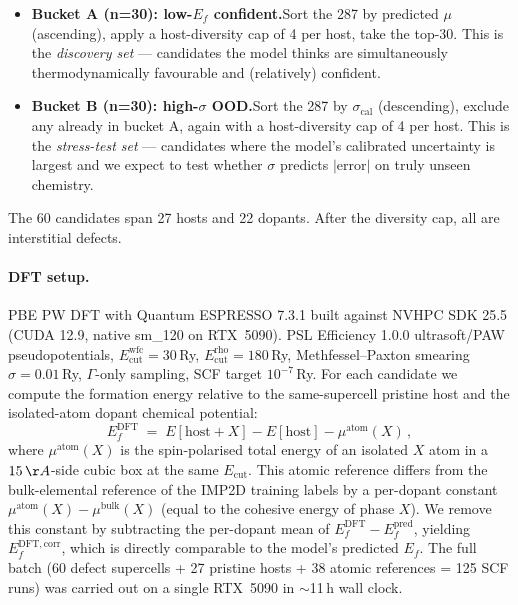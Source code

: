 \begin{itemize}
\item \textbf{Bucket A (n=30): low-$E_f$ confident.}\;Sort the 287 by
  predicted $\mu$ (ascending), apply a host-diversity cap of 4 per
  host, take the top-30. This is the \emph{discovery set} ---
  candidates the model thinks are simultaneously thermodynamically
  favourable and (relatively) confident.
\item \textbf{Bucket B (n=30): high-$\sigma$ OOD.}\;Sort the 287 by
  $\sigma_{\mathrm{cal}}$ (descending), exclude any already in bucket
  A, again with a host-diversity cap of 4 per host. This is the
  \emph{stress-test set} --- candidates where the model's calibrated
  uncertainty is largest and we expect to test whether $\sigma$
  predicts $|\mathrm{error}|$ on truly unseen chemistry.
\end{itemize}

The 60 candidates span 27 hosts and 22 dopants. After the
diversity cap, all are interstitial defects.

\paragraph{DFT setup.}
PBE PW DFT with Quantum ESPRESSO 7.3.1 built against NVHPC SDK 25.5
(CUDA 12.9, native sm\_120 on RTX~5090). PSL Efficiency 1.0.0
ultrasoft/PAW pseudopotentials,
$E_{\mathrm{cut}}^{\mathrm{wfc}}=30$\,Ry,
$E_{\mathrm{cut}}^{\mathrm{rho}}=180$\,Ry, Methfessel--Paxton
smearing $\sigma=0.01$\,Ry, $\Gamma$-only sampling, SCF target
$10^{-7}$\,Ry. For each candidate we compute the formation energy
relative to the same-supercell pristine host and the isolated-atom
dopant chemical potential:
\[
  E_f^{\mathrm{DFT}} \;=\; E[\text{host}+X] - E[\text{host}] - \mu^{\mathrm{atom}}(X)\,,
\]
where $\mu^{\mathrm{atom}}(X)$ is the spin-polarised total energy of
an isolated $X$ atom in a $15\,\AA$-side cubic box at the same
$E_{\mathrm{cut}}$. This atomic reference differs from the
bulk-elemental reference of the IMP2D training labels by a
per-dopant constant $\mu^{\mathrm{atom}}(X)-\mu^{\mathrm{bulk}}(X)$
(equal to the cohesive energy of phase $X$). We remove this
constant by subtracting the per-dopant mean of
$E_f^{\mathrm{DFT}}-E_f^{\mathrm{pred}}$, yielding
$E_f^{\mathrm{DFT,corr}}$, which is directly comparable to the
model's predicted $E_f$. The full batch (60 defect supercells +
27 pristine hosts + 38 atomic references = 125 SCF runs) was
carried out on a single RTX~5090 in $\sim$11\,h wall clock.

